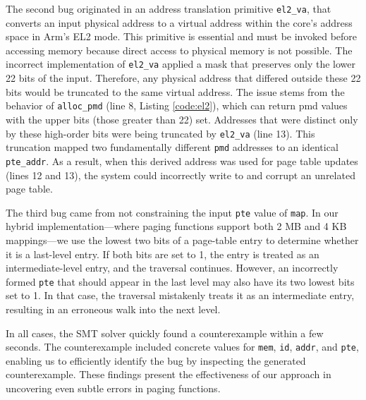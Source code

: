 The second bug originated in an address translation primitive \texttt{el2\_va}, that converts an input physical address to a virtual address within the core's address space in Arm's EL2 mode. This primitive is essential and must be invoked before accessing memory because direct access to physical memory is not possible. The incorrect implementation of \texttt{el2\_va} applied a mask that preserves only the lower 22 bits of the input. Therefore, any physical address that differed outside these 22 bits would be truncated to the same virtual address. %
The issue stems from the behavior of \texttt{alloc\_pmd} (line 8, Listing \autoref{code:el2}), which can return pmd values with the upper bits (those greater than 22) set. Addresses that were distinct only by these high-order bits were being truncated by \texttt{el2\_va} (line 13). This truncation mapped two fundamentally different \texttt{pmd} addresses to an identical \texttt{pte\_addr}. As a result, when this derived address was used for page table updates (lines 12 and 13), the system could incorrectly write to and corrupt an unrelated page table.


The third bug came from not constraining the input \texttt{pte} value of \texttt{map}. In our hybrid implementation—where paging functions support both 2 MB and 4 KB mappings—we use the lowest two bits of a page-table entry to determine whether it is a last-level entry. If both bits are set to 1, the entry is treated as an intermediate-level entry, and the traversal continues. However, an incorrectly formed \texttt{pte} that should appear in the last level may also have its two lowest bits set to 1. In that case, the traversal mistakenly treats it as an intermediate entry, resulting in an erroneous walk into the next level.

In all cases, the SMT solver quickly found a counterexample within a few seconds. The counterexample included concrete values for \texttt{mem}, \texttt{id}, \texttt{addr}, and \texttt{pte}, enabling us to efficiently identify the bug by inspecting the generated counterexample. These findings present the effectiveness of our approach in uncovering even subtle errors in paging functions.

